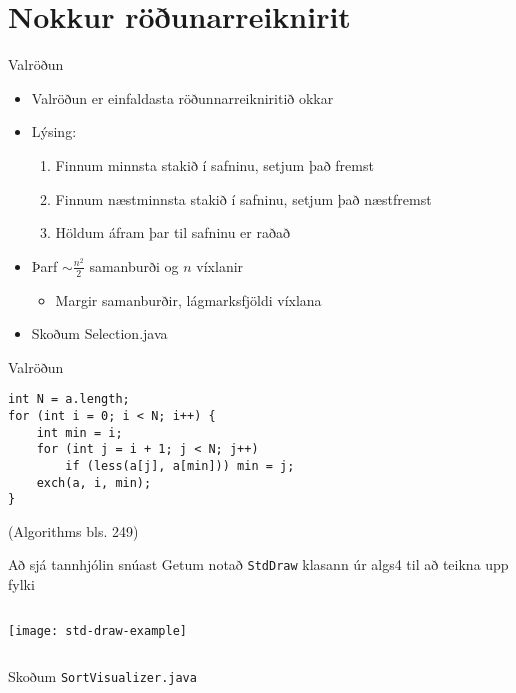 \documentclass{beamer}
\begin{document}
\section{Nokkur röðunarreiknirit}

\begin{frame}{Valröðun}
	\begin{itemize}
		\item Valröðun  er einfaldasta röðunnarreikniritið okkar
		\item Lýsing:
		      \begin{enumerate}
			      \item Finnum minnsta stakið í safninu, setjum það fremst
			      \item Finnum næstminnsta stakið í safninu, setjum það næstfremst
			      \item Höldum áfram þar til safninu er raðað
		      \end{enumerate}
		\item Þarf $\sim \frac{n^2}{2}$ samanburði og $n$ víxlanir
		      \begin{itemize}
			      \item Margir samanburðir, lágmarksfjöldi víxlana
		      \end{itemize}
		\item Skoðum Selection.java
	\end{itemize}
\end{frame}

\begin{frame}[fragile]{Valröðun}
	\begin{verbatim}
int N = a.length;
for (int i = 0; i < N; i++) { 
    int min = i;
    for (int j = i + 1; j < N; j++)
        if (less(a[j], a[min])) min = j;
    exch(a, i, min);
}
    \end{verbatim}
	(Algorithms bls. 249)
\end{frame}

\begin{frame}[fragile]{Að sjá tannhjólin snúast}
	Getum notað \texttt{StdDraw} klasann úr algs4 til að teikna upp fylki
	\begin{columns}
		\texttt{[image: std-draw-example]}
	\end{columns}
	Skoðum \texttt{SortVisualizer.java}
\end{frame}
\end{document}
